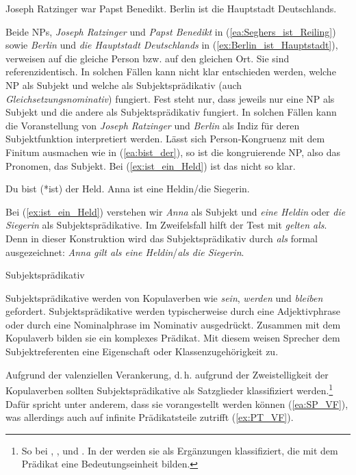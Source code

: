 \ea \label{ea:Kopula_Identiät} 
\ea \label{ea:Seghers_ist_Reiling} Joseph Ratzinger war Papst Benedikt.
\ex \label{ex:Berlin_ist_Hauptstadt} Berlin ist die Hauptstadt Deutschlands.
\z 
\z 

Beide NPs, \textit{Joseph Ratzinger} und \textit{Papst Benedikt} in (\ref{ea:Seghers_ist_Reiling}) sowie \textit{Berlin} und \textit{die Hauptstadt Deutschlands} in (\ref{ex:Berlin_ist_Hauptstadt}), verweisen auf die gleiche Person bzw. auf den gleichen Ort. Sie sind referenzidentisch. In solchen Fällen kann nicht klar entschieden werden, welche NP als Subjekt und welche als Subjektsprädikativ (auch \textit{Gleichsetzungsnominativ}) fungiert. Fest steht nur, dass jeweils nur eine NP als Subjekt und die andere als Subjektsprädikativ fungiert. In solchen Fällen kann die Voranstellung von \textit{Joseph Ratzinger} und \textit{Berlin} als Indiz für deren Subjektfunktion interpretiert werden. Lässt sich Person-Kongruenz mit dem Finitum ausmachen wie in (\ref{ea:bist_der}), so ist die kongruierende NP, also das Pronomen, das Subjekt. Bei (\ref{ex:ist_ein_Held}) ist das nicht so klar. 

\newpage
\ea \label{ea:Subjpräd_Subj}
\ea \label{ea:bist_der} Du bist (*ist) der Held.
\ex \label{ex:ist_ein_Held} Anna ist eine Heldin/die Siegerin.
\z 
\z 

Bei (\ref{ex:ist_ein_Held}) verstehen wir \textit{Anna} als Subjekt und \textit{eine Heldin} oder \textit{die Siegerin} als Subjektsprädikative. Im Zweifelsfall hilft der Test mit \textit{gelten als}. Denn in dieser Konstruktion wird das Subjektsprädikativ durch \textit{als} formal ausgezeichnet: \textit{Anna gilt als eine Heldin}/\textit{als die Siegerin}.

\begin{Definition}{Subjektsprädikativ}
    
\noindent Subjektsprädikative werden von Kopulaverben wie \textit{sein}, \textit{werden} und \textit{bleiben} gefordert. Subjektsprädikative werden typischerweise durch eine Adjektivphrase oder durch eine Nominalphrase im Nominativ ausgedrückt. Zusammen mit dem Kopulaverb bilden sie ein komplexes Prädikat. Mit diesem weisen Sprecher dem Subjektreferenten eine Eigenschaft oder Klassenzugehörigkeit zu.  
\end{Definition}


Aufgrund der valenziellen Verankerung, d.\,h. aufgrund der Zweistelligkeit der Kopulaverben sollten Subjektsprädikative als Satzglieder klassifiziert werden.\footnote{So bei \citet[264]{Erben1980}, \citet[91]{Eisenberg2020_Satz}, \citet[169]{Welke2007} und \citet[55]{Engel2014}. In der \citet[492, §808]{Duden2022} werden sie als Ergänzungen klassifiziert, die mit dem Prädikat eine Bedeutungseinheit bilden.} Dafür spricht unter anderem, dass sie vorangestellt werden können (\ref{ea:SP_VF}), was allerdings auch auf infinite Prädikatsteile zutrifft (\ref{ex:PT_VF}).


